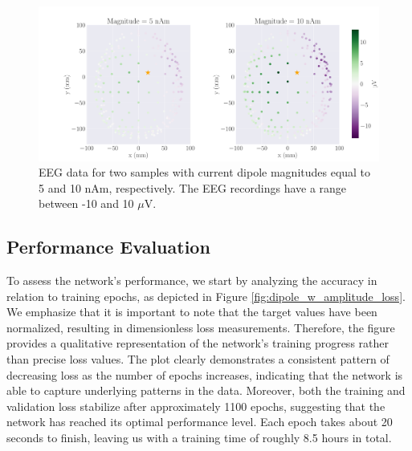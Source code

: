\documentclass[a4paper, UKenglish, 11pt]{uiomaster}
\begin{document}
\begin{figure}[!htb]
    \centering
    \includegraphics[width=\linewidth]{figures/purple_green/dipole_w_amplitude_example.pdf}
    \caption{EEG data for two samples with current dipole magnitudes equal to 5 and 10 nAm, respectively. The EEG recordings have a range between -10 and 10 $\mu$V.}
    \label{fig:dipole_w_amplitude_example}
\end{figure}


\subsection{Performance Evaluation}
To assess the network's performance, we start by analyzing the accuracy in relation to training epochs, as depicted in Figure \ref{fig:dipole_w_amplitude_loss}. We emphasize that it is important to note that the target values have been normalized, resulting in dimensionless loss measurements. Therefore, the figure provides a qualitative representation of the network's training progress rather than precise loss values. The plot clearly demonstrates a consistent pattern of decreasing loss as the number of epochs increases, indicating that the network is able to capture underlying patterns in the data. Moreover, both the training and validation loss stabilize after approximately 1100 epochs, suggesting that the network has reached its optimal performance level. Each epoch takes about 20 seconds to finish, leaving us with a training time of roughly 8.5 hours in total.
\end{document}
